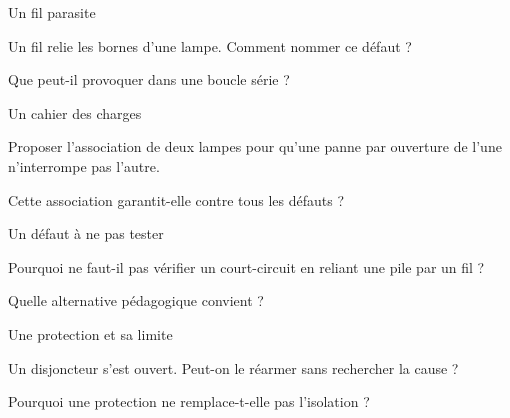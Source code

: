 \par\noindent\begin{minipage}{\linewidth}
\begin{exercice}[2]{Un fil parasite}
\begin{questions}
\item Un fil relie les bornes d’une lampe. Comment nommer ce défaut ?
\item Que peut-il provoquer dans une boucle série ?
\end{questions}
\end{exercice}
\end{minipage}
\clearpage{}
\par\noindent\begin{minipage}{\linewidth}
\begin{exercice}[3]{Un cahier des charges}
\begin{questions}
\item Proposer l’association de deux lampes pour qu’une panne par ouverture de l’une n’interrompe pas l’autre.
\item Cette association garantit-elle contre tous les défauts ?
\end{questions}
\end{exercice}
\end{minipage}
\par\noindent\begin{minipage}{\linewidth}
\begin{exercice}[3]{Un défaut à ne pas tester}
\begin{questions}
\item Pourquoi ne faut-il pas vérifier un court-circuit en reliant une pile par un fil ?
\item Quelle alternative pédagogique convient ?
\end{questions}
\end{exercice}
\end{minipage}
\par\noindent\begin{minipage}{\linewidth}
\begin{exercice}[3]{Une protection et sa limite}
\begin{questions}
\item Un disjoncteur s’est ouvert. Peut-on le réarmer sans rechercher la cause ?
\item Pourquoi une protection ne remplace-t-elle pas l’isolation ?
\end{questions}
\end{exercice}
\end{minipage}
